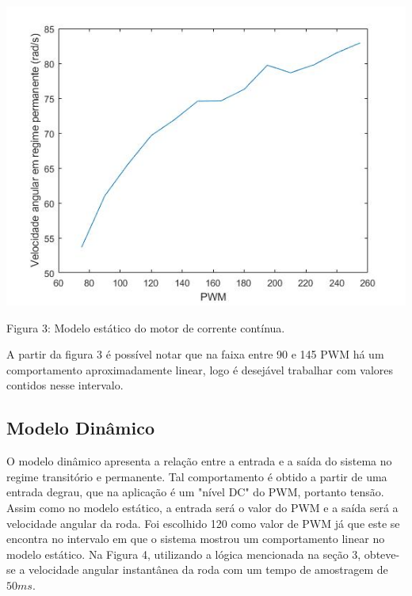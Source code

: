 \documentclass{article}
\begin{document}
\begin{center}
\centering
  \includegraphics[scale=0.5]{imagens/untitled.jpg}
  
  \caption{Figura 3: Modelo estático do motor de corrente contínua.}
\end{center}

A partir da figura 3 é possível notar que na faixa entre 90 e 145 PWM há um comportamento aproximadamente linear, logo é desejável trabalhar com valores contidos nesse intervalo.


\subsection{Modelo Dinâmico}
O modelo dinâmico apresenta a relação entre a entrada e a saída do sistema no regime transitório e permanente. Tal comportamento é obtido a partir de uma entrada degrau, que na aplicação é um "nível DC" do PWM, portanto tensão.
Assim como no modelo estático, a entrada será o valor do PWM e a saída será a velocidade angular da roda. Foi escolhido 120 como valor de PWM já que este se encontra no intervalo em que o sistema mostrou um comportamento linear no modelo estático. Na Figura 4, utilizando a lógica mencionada na seção 3, obteve-se a velocidade angular instantânea da roda com um tempo de amostragem de $50ms$.
\end{document}
